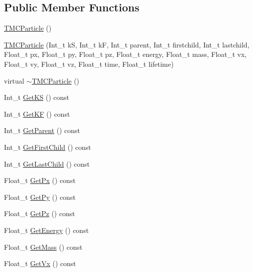 \subsection*{Public Member Functions}
\begin{DoxyCompactItemize}
\item 
\hyperlink{class_t_m_c_particle_af7743ade6a8f7aee812971bc25c66391}{T\+M\+C\+Particle} ()
\item 
\hyperlink{class_t_m_c_particle_a883558d9731770b161f9f62f5a7af513}{T\+M\+C\+Particle} (Int\+\_\+t k\+S, Int\+\_\+t k\+F, Int\+\_\+t parent, Int\+\_\+t firstchild, Int\+\_\+t lastchild, Float\+\_\+t px, Float\+\_\+t py, Float\+\_\+t pz, Float\+\_\+t energy, Float\+\_\+t mass, Float\+\_\+t vx, Float\+\_\+t vy, Float\+\_\+t vz, Float\+\_\+t time, Float\+\_\+t lifetime)
\item 
virtual \hyperlink{class_t_m_c_particle_af36f6b77a0ef1322466cc77c55483f5a}{$\sim$\+T\+M\+C\+Particle} ()
\item 
Int\+\_\+t \hyperlink{class_t_m_c_particle_ae7a6c0fc166a0b63e334076a7d263071}{Get\+K\+S} () const 
\item 
Int\+\_\+t \hyperlink{class_t_m_c_particle_a8f46837409df3f80556763a33a68eb41}{Get\+K\+F} () const 
\item 
Int\+\_\+t \hyperlink{class_t_m_c_particle_aec44cccdf9c0ebe684240d7adfbeebeb}{Get\+Parent} () const 
\item 
Int\+\_\+t \hyperlink{class_t_m_c_particle_ac899f2183660f940dbe3cd35511a3fe7}{Get\+First\+Child} () const 
\item 
Int\+\_\+t \hyperlink{class_t_m_c_particle_ac609bb62ec77df8424ca81059e40232a}{Get\+Last\+Child} () const 
\item 
Float\+\_\+t \hyperlink{class_t_m_c_particle_a0ff56b5387737810ed5c10572ca0d480}{Get\+Px} () const 
\item 
Float\+\_\+t \hyperlink{class_t_m_c_particle_af884c174eb829d08bebbe0f4f033d71a}{Get\+Py} () const 
\item 
Float\+\_\+t \hyperlink{class_t_m_c_particle_aad98a16a2b511a5266b324badc05975e}{Get\+Pz} () const 
\item 
Float\+\_\+t \hyperlink{class_t_m_c_particle_ab7100a3ca901d37f44a67172f96cd798}{Get\+Energy} () const 
\item 
Float\+\_\+t \hyperlink{class_t_m_c_particle_aa625d9c085792b2c8818ac580d613635}{Get\+Mass} () const 
\item 
Float\+\_\+t \hyperlink{class_t_m_c_particle_ac971d7b3ab65ba2c9648a324228f36b6}{Get\+Vx} () const 
\item 

\end{DoxyCompactItemize}
